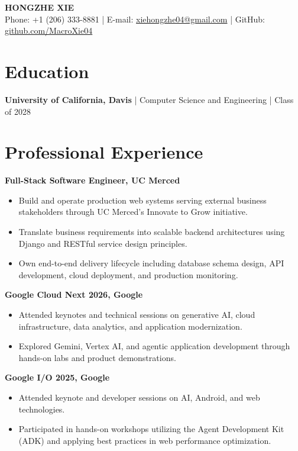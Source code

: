 \documentclass[11pt]{article}
\begin{document}
\begin{center}
    {\LARGE \textbf{HONGZHE XIE}}\\[4pt]
    Phone: +1 (206) 333-8881 \quad|\quad
    E-mail: \href{mailto:xiehongzhe04@gmail.com}{xiehongzhe04@gmail.com} \quad|\quad
    GitHub: \href{https://github.com/MacroXie04}{github.com/MacroXie04}
\end{center}

\section{Education}
\textbf{University of California, Davis} \;|\; Computer Science and Engineering \;|\; Class of 2028

\section{Professional Experience}

\textbf{Full-Stack Software Engineer, UC Merced}
\begin{itemize}
    \item Build and operate production web systems serving external business stakeholders through UC Merced's Innovate to Grow initiative.
    \item Translate business requirements into scalable backend architectures using Django and RESTful service design principles.
    \item Own end-to-end delivery lifecycle including database schema design, API development, cloud deployment, and production monitoring.
\end{itemize}

\textbf{Google Cloud Next 2026, Google}
\begin{itemize}
    \item Attended keynotes and technical sessions on generative AI, cloud infrastructure, data analytics, and application modernization.
    \item Explored Gemini, Vertex AI, and agentic application development through hands-on labs and product demonstrations.
\end{itemize}

\textbf{Google I/O 2025, Google}
\begin{itemize}
    \item Attended keynote and developer sessions on AI, Android, and web technologies.
    \item Participated in hands-on workshops utilizing the Agent Development Kit (ADK) and applying best practices in web performance optimization.
\end{itemize}
\end{document}
